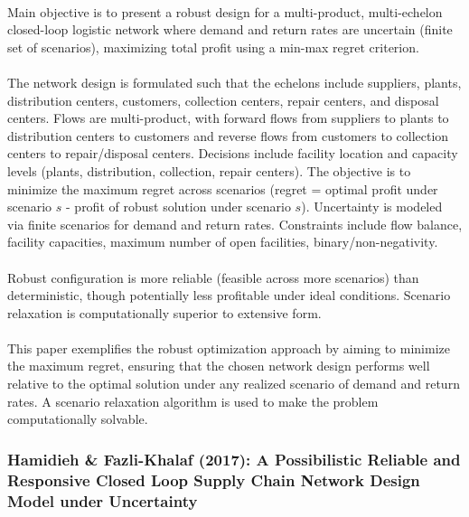 \paragraph{} Main objective is to present a robust design for a multi-product, multi-echelon closed-loop logistic network where demand and return rates are uncertain (finite set of scenarios), maximizing total profit using a min-max regret criterion.

\paragraph{} The network design is formulated such that the echelons include suppliers, plants, distribution centers, customers, collection centers, repair centers, and disposal centers. Flows are multi-product, with forward flows from suppliers to plants to distribution centers to customers and reverse flows from customers to collection centers to repair/disposal centers. Decisions include facility location and capacity levels (plants, distribution, collection, repair centers). The objective is to minimize the maximum regret across scenarios (regret = optimal profit under scenario $s$ - profit of robust solution under scenario $s$). Uncertainty is modeled via finite scenarios for demand and return rates. Constraints include flow balance, facility capacities, maximum number of open facilities, binary/non-negativity.

\paragraph{} Robust configuration is more reliable (feasible across more scenarios) than deterministic, though potentially less profitable under ideal conditions. Scenario relaxation is computationally superior to extensive form.

\paragraph{} This paper exemplifies the robust optimization approach by aiming to minimize the maximum regret, ensuring that the chosen network design performs well relative to the optimal solution under any realized scenario of demand and return rates. A scenario relaxation algorithm is used to make the problem computationally solvable.

\subsubsection{Hamidieh \& Fazli-Khalaf (2017): A Possibilistic Reliable and Responsive Closed Loop Supply Chain Network Design Model under Uncertainty}
